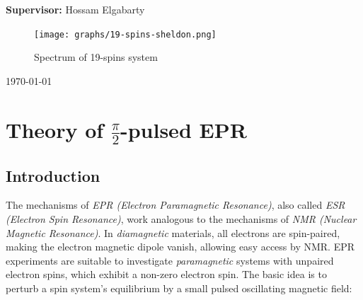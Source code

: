 \documentclass[11.5pt,a4paper]{article}
\begin{document}
{\bf Supervisor:} Hossam Elgabarty

\vspace{1cm}

\begin{figure}[h!]
  \centering
  \texttt{[image: graphs/19-spins-sheldon.png]}
  \caption{Spectrum of 19-spins system}
  \label{fig-19-spins-spectrum}
\end{figure}

\newpage
\tableofcontents

\vfill
\hfill \today 


\newpage

\section{Theory of $\tfrac{\pi}{2}$-pulsed EPR}
\subsection{Introduction}
The mechanisms of \emph{EPR (Electron Paramagnetic Resonance)}, also called \emph{ESR (Electron Spin Resonance)}, work analogous to the mechanisms of \emph{NMR (Nuclear Magnetic Resonance)}. In \emph{diamagnetic} materials, all electrons are spin-paired, making the electron magnetic dipole vanish, allowing easy access by NMR. 
EPR experiments are suitable to investigate \emph{paramagnetic} systems with unpaired electron spins, which exhibit a non-zero electron spin. The basic idea is to perturb a spin system's equilibrium by a small pulsed oscillating magnetic field:
\end{document}
